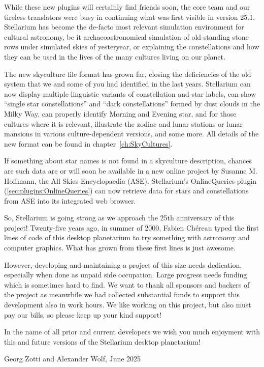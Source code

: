 While these new plugins will certainly find friends soon, the core team and our tireless translators were busy 
in continuing what was first visible in version 25.1. 
Stellarium has become the de-facto most relevant simulation environment for cultural astronomy, 
be it archaeoastronomical simulation of old standing stone rows under simulated skies of yesteryear, 
or explaining the constellations and how they can be used in the lives of the many cultures living on our planet. 

The new skyculture file format has grown far, closing the deficiencies of the old system that we and some of you had identified in the last years. 
Stellarium can now display multiple linguistic variants of constellation and star labels, can show ``single star constellations'' and ``dark constellations'' 
formed by dust clouds in the Milky Way, can properly identify Morning and Evening star, and for those cultures where it is relevant, 
illustrate the zodiac and lunar stations or lunar mansions in various culture-dependent versions, and some more. 
All details of the new format can be found in chapter~\ref{ch:SkyCultures}.

If something about star names is not found in a skyculture description, chances are such data are 
or will soon be available in a new online project by Susanne M. Hoffmann, the All Skies Encyclopaedia (ASE). 
Stellarium's OnlineQueries plugin (\ref{sec:plugins:OnlineQueries}) can now retrieve data for stars and constellations from ASE into its integrated web browser. 


So, Stellarium is going strong as we approach the  25th anniversary of this project! 
Twenty-five years ago, in summer of 2000,  Fabien Ch\'ereau typed the
first lines of code of this desktop planetarium to try something with astronomy and computer graphics. 
What has grown from these first lines is just awesome.


However, developing and maintaining a project of this size needs dedication, especially when done as unpaid side occupation. 
Large progress needs funding which is sometimes hard to find. 
We want to thank all sponsors and backers of the project as meanwhile we had collected substantial funds to support this development 
also in work hours. We like working on this project, but also must pay our bills, so please keep up your kind support! 




In the name of all prior and current developers we wish you much enjoyment with
this and future versions of the Stellarium desktop planetarium!

\begin{flushright}
Georg Zotti and Alexander Wolf, June 2025
\end{flushright}





